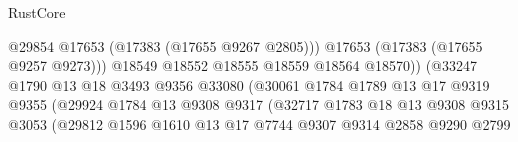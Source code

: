 \begin{lexlean}{RustCore}
\begin{coremodule}
                                                  @29854
                                                  @17653
                                                  (@17383 (@17655 @9267 @2805)))
                                                @17653
                                                (@17383 (@17655 @9257 @9273)))
                                              @18549
                                              @18552
                                              @18555
                                              @18559
                                              @18564
                                              @18570))
                                          (@33247
                                            @1790
                                            @13
                                            @18
                                            @3493
                                            @9356
                                            @33080
                                            (@30061
                                              @1784
                                              @1789
                                              @13
                                              @17
                                              @9319
                                              @9355
                                              (@29924
                                                @1784
                                                @13
                                                @9308
                                                @9317
                                                (@32717
                                                  @1783
                                                  @18
                                                  @13
                                                  @9308
                                                  @9315
                                                  @3053
                                                  (@29812
                                                    @1596
                                                    @1610
                                                    @13
                                                    @17
                                                    @7744
                                                    @9307
                                                    @9314
                                                    @2858
                                                    @9290
                                                    @2799

\end{coremodule}
\end{lexlean}
